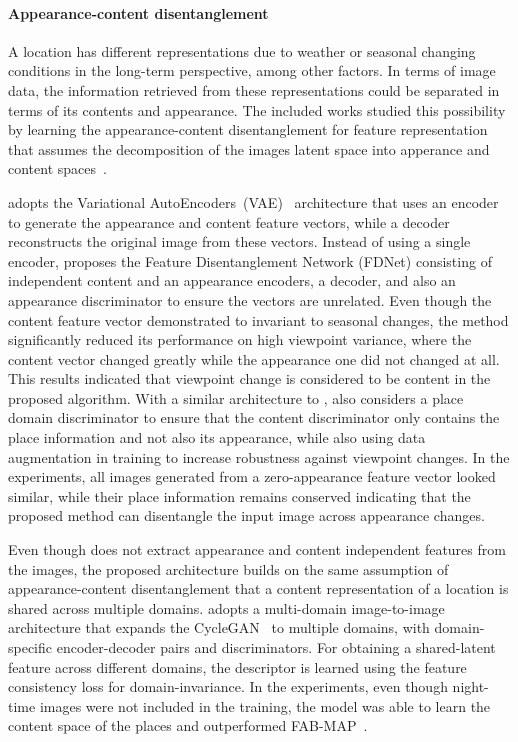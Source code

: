 \paragraph{Appearance-content disentanglement}

A location has different representations due to weather or seasonal changing conditions in the long-term perspective, among other factors. In terms of image data, the information retrieved from these representations could be separated in terms of its contents and appearance. The included works studied this possibility by learning the appearance-content disentanglement for feature representation that assumes the decomposition of the images latent space into apperance and content spaces~\parencite{qin-et-al:2020:103561}.

\cite{oh-eoh:2021:app11198976} adopts the Variational AutoEncoders~(VAE)~\parencite{original:vae} architecture that uses an encoder to generate the appearance and content feature vectors, while a decoder reconstructs the original image from these vectors.
Instead of using a single encoder, \cite{qin-et-al:2020:103561} proposes the Feature Disentanglement Network (FDNet) consisting of independent content and an appearance encoders, a decoder, and also an appearance discriminator to ensure the vectors are unrelated. Even though the content feature vector demonstrated to invariant to seasonal changes, the method significantly reduced its performance on high viewpoint variance, where the content vector changed greatly while the appearance one did not changed at all. This results indicated that viewpoint change is considered to be content in the proposed algorithm.
With a similar architecture to \cite{qin-et-al:2020:103561}, \cite{tang-et-al:2021:17298814211037497} also considers a place domain discriminator to ensure that the content discriminator only contains the place information and not also its appearance, while also using data augmentation in training to increase robustness against viewpoint changes. In the experiments, all images generated from a zero-appearance feature vector looked similar, while their place information remains conserved indicating that the proposed method can disentangle the input image across appearance changes.

Even though \cite{hu-et-al:2022:1003907} does not extract appearance and content independent features from the images, the proposed architecture builds on the same assumption of appearance-content disentanglement that a content representation of a location is shared across multiple domains.
\cite{hu-et-al:2022:1003907} adopts a multi-domain image-to-image architecture that expands the CycleGAN~\parencite{original:cyclegan} to multiple domains, with domain-specific encoder-decoder pairs and discriminators.
For obtaining a shared-latent feature across different domains, the descriptor is learned using the feature consistency loss for domain-invariance.
In the experiments, even though night-time images were not included in the training, the model was able to learn the content space of the places and outperformed FAB-MAP~\parencite{discussion:fab-map}.



